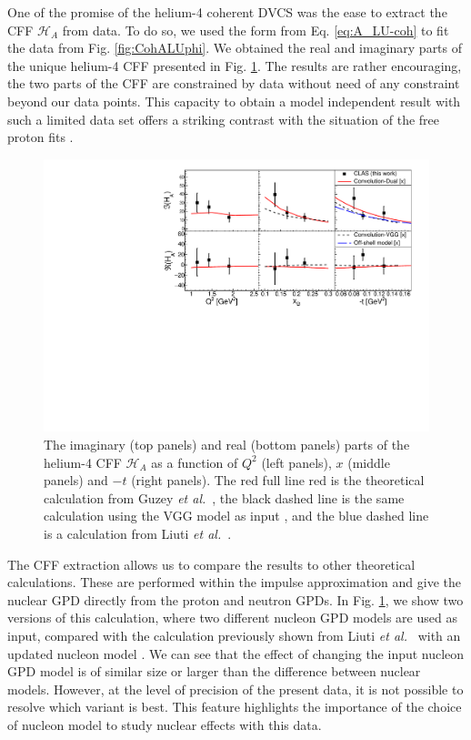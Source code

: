 \documentclass[aps,prc,preprint,superscriptaddress]{revtex4}
\begin{document}
One of the promise of the helium-4 coherent DVCS was the ease to extract the CFF $\mathcal{H}_A$ from
data. To do so, we used the form from Eq. \ref{eq:A_LU-coh} to fit the data from Fig. 
\ref{fig:CohALUphi}. We obtained the real and imaginary parts of the unique helium-4
CFF presented in Fig. \ref{fig:CohCFF}. The results are rather encouraging, the two parts
of the CFF are constrained by data without need of any constraint beyond our data points. This 
capacity to obtain a
model independent result with such a limited data set offers a striking contrast with the
situation of the free proton fits \cite{Dupre:2016mai,Dupre:2017hfs}.

\begin{figure}[tbp!]
\center
\includegraphics[width=14cm]{fig3/Coherent_CFF.pdf}
	\caption{The imaginary (top panels) and real (bottom panels) parts of the helium-4
	CFF $\mathcal{H}_A$ as a function of $Q^2$ (left panels), $x$ (middle panels) and 
	$-t$ (right panels). The red full line red is the theoretical calculation from 
	Guzey {\it et al.}~\cite{Guzey:2003jh,Guzey:2008th}, the black dashed line is the same calculation 
	using the VGG model as input \cite{Vanderhaeghen:1999xj,Guidal:2004nd}, and
	the blue dashed line is a calculation from Liuti {\it et 
	al.}~\cite{Liuti:2005gi,GonzalezHernandez:2012jv}.} 
\label{fig:CohCFF}
\end{figure}

The CFF extraction allows us to compare the results to other theoretical calculations.
These are performed within the impulse approximation \cite{Guzey:2003jh,Guzey:2008th} 
and give the nuclear GPD directly from the proton and neutron GPDs. In 
Fig. \ref{fig:CohCFF}, we show two versions of this calculation, where two different nucleon GPD
models are used as input, compared with the calculation previously shown from Liuti 
{\it et al.}~\cite{Liuti:2005gi} with an updated nucleon model \cite{GonzalezHernandez:2012jv}.
We can see that the effect of changing the input nucleon GPD model
is of similar size or larger than the difference between nuclear 
models. However, at the level of precision of the present data,
it is not possible to resolve which variant is best. This feature highlights the 
importance of the choice of nucleon model to study nuclear effects with this data.
\end{document}
